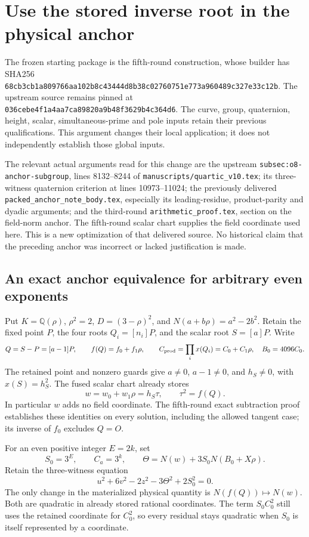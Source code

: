 \section{Use the stored inverse root in the physical anchor}

The frozen starting package is the fifth-round construction, whose builder
has SHA256
\texttt{68cb3cb1a809766aa102b8c43444d8b38c02760751e773a960489c327e33c12b}.
The upstream source remains pinned at
\texttt{036cebe4f1a4aa7ca89820a9b48f3629b4c364d6}.
The curve, group, quaternion, height, scalar, simultaneous-prime and pole
inputs retain their previous qualifications. This argument changes their
local application; it does not independently establish those global inputs.

The relevant actual arguments read for this change are the upstream
\texttt{subsec:o8-anchor-subgroup}, lines 8132--8244 of
\texttt{manuscripts/quartic\_v10.tex}; its three-witness quaternion
criterion at lines 10973--11024; the previously delivered
\texttt{packed\_anchor\_note\_body.tex}, especially its leading-residue,
product-parity and dyadic arguments; and the third-round
\texttt{arithmetic\_proof.tex}, section on the field-norm anchor.
The fifth-round scalar chart supplies the field coordinate used here.
This is a new optimization of that delivered source. No historical claim
that the preceding anchor was incorrect or lacked justification is made.

\subsection{An exact anchor equivalence for arbitrary even exponents}

Put $K=\mathbb Q(\rho)$, $\rho^2=2$, $D=(3-\rho)^2$, and
$N(a+b\rho)=a^2-2b^2$. Retain the fixed point $P$, the four roots
$Q_i=[n_i]P$, and the scalar root $S=[a]P$. Write
\[
 Q=S-P=[a-1]P,\qquad f(Q)=f_0+f_1\rho,\qquad
 C_{\rm prod}=\prod_i x(Q_i)=C_0+C_1\rho,\quad B_0=4096C_0.
\]
The retained point and nonzero guards give $a\ne0$, $a-1\ne0$,
and $h_S\ne0$, with $x(S)=h_S^2$.
The fused scalar chart already stores
\[
 w=w_0+w_1\rho=h_S\tau,\qquad \tau^2=f(Q).
\]
In particular $w$ adds no field coordinate. The fifth-round exact
subtraction proof establishes these identities on every solution, including
the allowed tangent case; its inverse of $f_0$ excludes $Q=O$.

For an even positive integer $E=2k$, set
\[
 S_0=3^E,\qquad C_a=3^k,
 \qquad
 \Theta=N(w)+3S_0N(B_0+X\rho).
\]
Retain the three-witness equation
\[
 u^2+6v^2-2z^2-3\Theta^2+2S_0^2=0.             \tag{A}
\]
The only change in the materialized physical quantity is
$N(f(Q))\longmapsto N(w)$. Both are quadratic in already stored rational
coordinates. The term $S_0C_0^2$ still uses the retained coordinate for
$C_0^2$, so every residual stays quadratic when $S_0$ is itself represented
by a coordinate.

